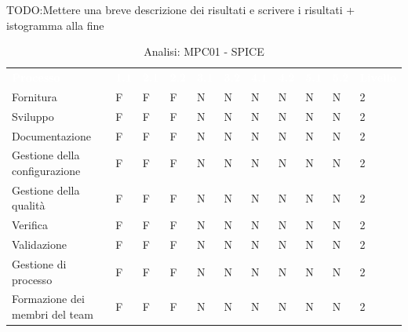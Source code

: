 TODO:Mettere una breve descrizione dei risultati e scrivere i risultati + istogramma alla fine 
\begin{table}[H]
        \renewcommand{\arraystretch}{1.5}
        \begin{tabular}{ m{}<{\centering}  m{}<{\centering} m{}<{\centering} m{}<{\centering} m{}<{\centering} m{}<{\centering} m{}<{\centering} m{}<{\centering} m{}<{\centering} m{}<{\centering} m{}<{\centering}}
	\rowcolor{darkblue}
	\textcolor{white}{\textbf{Processo}} &\textcolor{white}{\textbf{1.1}} &\textcolor{white}{\textbf{2.1}} &\textcolor{white}{\textbf{2.2}} &\textcolor{white}{\textbf{3.1}} &\textcolor{white}{\textbf{3.2}} &\textcolor{white}{\textbf{4.1}} &\textcolor{white}{\textbf{4.2}} &\textcolor{white}{\textbf{5.1}} &\textcolor{white}{\textbf{5.2}} &\textcolor{white}{\textbf{Livello}}\\ 

    Fornitura & F & F & F & N & N & N & N & N & N & 2 \\
    Sviluppo & F & F & F & N & N & N & N & N & N & 2 \\
    Documentazione & F & F & F & N & N & N & N & N & N & 2 \\
    Gestione della configurazione & F & F & F & N & N & N & N & N & N & 2 \\
    Gestione della qualità & F & F & F & N & N & N & N & N & N & 2 \\
    Verifica & F & F & F & N & N & N & N & N & N & 2 \\
    Validazione & F & F & F & N & N & N & N & N & N & 2 \\
    Gestione di processo & F & F & F & N & N & N & N & N & N & 2 \\
    Formazione dei membri del team & F & F & F & N & N & N & N & N & N & 2 \\
    
    \end{tabular}
\caption{Analisi: MPC01 - SPICE}
\end{table}

